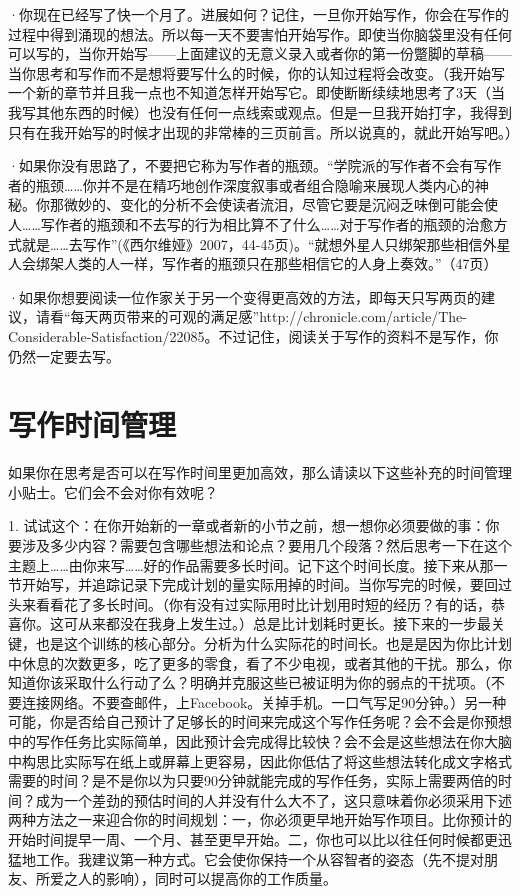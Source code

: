 \documentclass{ctexart}
\begin{document}
·你现在已经写了快一个月了。进展如何？记住，一旦你开始写作，你会在写作的过程中得到涌现的想法。所以每一天不要害怕开始写作。即使当你脑袋里没有任何可以写的，当你开始写——上面建议的无意义录入或者你的第一份蹩脚的草稿——当你思考和写作而不是想将要写什么的时候，你的认知过程将会改变。（我开始写一个新的章节并且我一点也不知道怎样开始写它。即使断断续续地思考了3天（当我写其他东西的时候）也没有任何一点线索或观点。但是一旦我开始打字，我得到只有在我开始写的时候才出现的非常棒的三页前言。所以说真的，就此开始写吧。）

·如果你没有思路了，不要把它称为写作者的瓶颈。“学院派的写作者不会有写作者的瓶颈……你并不是在精巧地创作深度叙事或者组合隐喻来展现人类内心的神秘。你那微妙的、变化的分析不会使读者流泪，尽管它要是沉闷乏味倒可能会使人……写作者的瓶颈和不去写的行为相比算不了什么……对于写作者的瓶颈的治愈方式就是……去写作”(《西尔维娅》2007，44-45页)。“就想外星人只绑架那些相信外星人会绑架人类的人一样，写作者的瓶颈只在那些相信它的人身上奏效。”（47页）

·如果你想要阅读一位作家关于另一个变得更高效的方法，即每天只写两页的建议，请看“每天两页带来的可观的满足感”http://chronicle.com/article/The-Considerable-Satisfaction/22085。不过记住，阅读关于写作的资料不是写作，你仍然一定要去写。

\section{写作时间管理}
如果你在思考是否可以在写作时间里更加高效，那么请读以下这些补充的时间管理小贴士。它们会不会对你有效呢？

1. 试试这个：在你开始新的一章或者新的小节之前，想一想你必须要做的事：你要涉及多少内容？需要包含哪些想法和论点？要用几个段落？然后思考一下在这个主题上……由你来写……好的作品需要多长时间。记下这个时间长度。接下来从那一节开始写，并追踪记录下完成计划的量实际用掉的时间。当你写完的时候，要回过头来看看花了多长时间。（你有没有过实际用时比计划用时短的经历？有的话，恭喜你。这可从来都没在我身上发生过。）总是比计划耗时更长。接下来的一步最关键，也是这个训练的核心部分。分析为什么实际花的时间长。也是是因为你比计划中休息的次数更多，吃了更多的零食，看了不少电视，或者其他的干扰。那么，你知道你该采取什么行动了么？明确并克服这些已被证明为你的弱点的干扰项。（不要连接网络。不要查邮件，上Facebook。关掉手机。一口气写足90分钟。）另一种可能，你是否给自己预计了足够长的时间来完成这个写作任务呢？会不会是你预想中的写作任务比实际简单，因此预计会完成得比较快？会不会是这些想法在你大脑中构思比实际写在纸上或屏幕上更容易，因此你低估了将这些想法转化成文字格式需要的时间？是不是你以为只要90分钟就能完成的写作任务，实际上需要两倍的时间？成为一个差劲的预估时间的人并没有什么大不了，这只意味着你必须采用下述两种方法之一来迎合你的时间规划：一，你必须更早地开始写作项目。比你预计的开始时间提早一周、一个月、甚至更早开始。二，你也可以比以往任何时候都更迅猛地工作。我建议第一种方式。它会使你保持一个从容智者的姿态（先不提对朋友、所爱之人的影响），同时可以提高你的工作质量。
\end{document}
